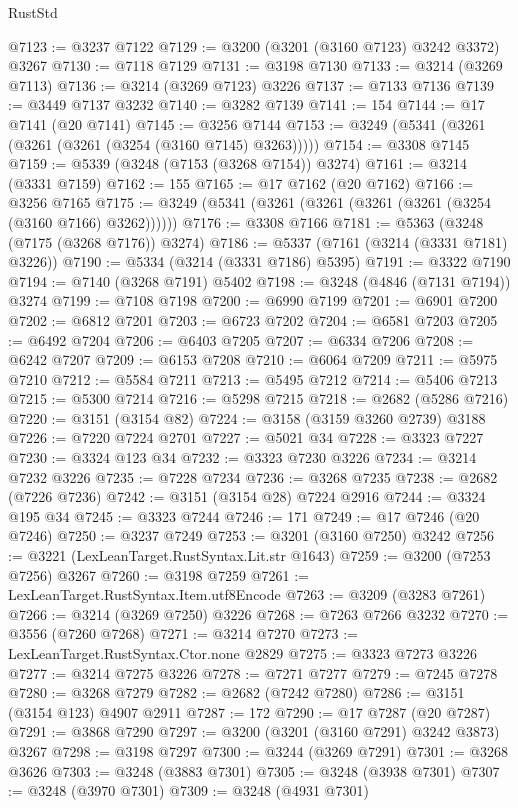\begin{lexlean}{RustStd}
\begin{coremodule}
{\begin{coremodule}
{{{{{{{{{{{{{{{{{{{{{{{{{@7123 := @3237 @7122
@7129 := @3200 (@3201 (@3160 @7123) @3242 @3372) @3267
@7130 := @7118 @7129
@7131 := @3198 @7130
@7133 := @3214 (@3269 @7113)
@7136 := @3214 (@3269 @7123) @3226
@7137 := @7133 @7136
@7139 := @3449 @7137 @3232
@7140 := @3282 @7139
@7141 := 154
@7144 := @17 @7141 (@20 @7141)
@7145 := @3256 @7144
@7153 := @3249 (@5341 (@3261 (@3261 (@3261 (@3254 (@3160 @7145) @3263)))))
@7154 := @3308 @7145
@7159 := @5339 (@3248 (@7153 (@3268 @7154)) @3274)
@7161 := @3214 (@3331 @7159)
@7162 := 155
@7165 := @17 @7162 (@20 @7162)
@7166 := @3256 @7165
@7175 := @3249 (@5341 (@3261 (@3261 (@3261 (@3261 (@3254 (@3160 @7166) @3262))))))
@7176 := @3308 @7166
@7181 := @5363 (@3248 (@7175 (@3268 @7176)) @3274)
@7186 := @5337 (@7161 (@3214 (@3331 @7181) @3226))
@7190 := @5334 (@3214 (@3331 @7186) @5395)
@7191 := @3322 @7190
@7194 := @7140 (@3268 @7191) @5402
@7198 := @3248 (@4846 (@7131 @7194)) @3274
@7199 := @7108 @7198
@7200 := @6990 @7199
@7201 := @6901 @7200
@7202 := @6812 @7201
@7203 := @6723 @7202
@7204 := @6581 @7203
@7205 := @6492 @7204
@7206 := @6403 @7205
@7207 := @6334 @7206
@7208 := @6242 @7207
@7209 := @6153 @7208
@7210 := @6064 @7209
@7211 := @5975 @7210
@7212 := @5584 @7211
@7213 := @5495 @7212
@7214 := @5406 @7213
@7215 := @5300 @7214
@7216 := @5298 @7215
@7218 := @2682 (@5286 @7216)
@7220 := @3151 (@3154 @82)
@7224 := @3158 (@3159 @3260 @2739) @3188
@7226 := @7220 @7224 @2701
@7227 := @5021 @34
@7228 := @3323 @7227
@7230 := @3324 @123 @34
@7232 := @3323 @7230 @3226
@7234 := @3214 @7232 @3226
@7235 := @7228 @7234
@7236 := @3268 @7235
@7238 := @2682 (@7226 @7236)
@7242 := @3151 (@3154 @28) @7224 @2916
@7244 := @3324 @195 @34
@7245 := @3323 @7244
@7246 := 171
@7249 := @17 @7246 (@20 @7246)
@7250 := @3237 @7249
@7253 := @3201 (@3160 @7250) @3242
@7256 := @3221 (LexLeanTarget.RustSyntax.Lit.str @1643)
@7259 := @3200 (@7253 @7256) @3267
@7260 := @3198 @7259
@7261 := LexLeanTarget.RustSyntax.Item.utf8Encode
@7263 := @3209 (@3283 @7261)
@7266 := @3214 (@3269 @7250) @3226
@7268 := @7263 @7266 @3232
@7270 := @3556 (@7260 @7268)
@7271 := @3214 @7270
@7273 := LexLeanTarget.RustSyntax.Ctor.none @2829
@7275 := @3323 @7273 @3226
@7277 := @3214 @7275 @3226
@7278 := @7271 @7277
@7279 := @7245 @7278
@7280 := @3268 @7279
@7282 := @2682 (@7242 @7280)
@7286 := @3151 (@3154 @123) @4907 @2911
@7287 := 172
@7290 := @17 @7287 (@20 @7287)
@7291 := @3868 @7290
@7297 := @3200 (@3201 (@3160 @7291) @3242 @3873) @3267
@7298 := @3198 @7297
@7300 := @3244 (@3269 @7291)
@7301 := @3268 @3626
@7303 := @3248 (@3883 @7301)
@7305 := @3248 (@3938 @7301)
@7307 := @3248 (@3970 @7301)
@7309 := @3248 (@4931 @7301)
}}}}}}}}}}}}}}}}}}}}}}}}}
\end{coremodule}}
\end{coremodule}
\end{lexlean}
